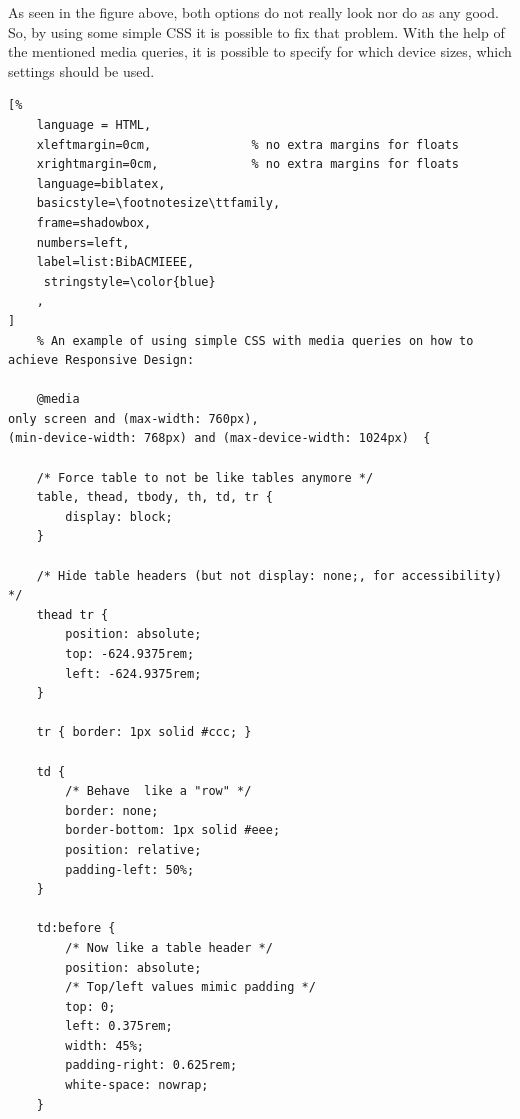 As seen in the figure above, both options do not really look nor do as any good.
So, by using some simple CSS it is possible to fix that problem. With the help of the mentioned
media queries, it is possible to specify for which device sizes, which settings should be used.

\begin{lstlisting}[%
    language = HTML,
    xleftmargin=0cm,              % no extra margins for floats
    xrightmargin=0cm,             % no extra margins for floats
    language=biblatex,
    basicstyle=\footnotesize\ttfamily,
    frame=shadowbox,
    numbers=left,
    label=list:BibACMIEEE,
     stringstyle=\color{blue}
    ,
]
    % An example of using simple CSS with media queries on how to achieve Responsive Design:

    @media
only screen and (max-width: 760px),
(min-device-width: 768px) and (max-device-width: 1024px)  {

	/* Force table to not be like tables anymore */
	table, thead, tbody, th, td, tr {
		display: block;
	}

	/* Hide table headers (but not display: none;, for accessibility) */
	thead tr {
		position: absolute;
		top: -624.9375rem;
		left: -624.9375rem;
	}

	tr { border: 1px solid #ccc; }

	td {
		/* Behave  like a "row" */
		border: none;
		border-bottom: 1px solid #eee;
		position: relative;
		padding-left: 50%;
	}

	td:before {
		/* Now like a table header */
		position: absolute;
		/* Top/left values mimic padding */
		top: 0;
		left: 0.375rem;
		width: 45%;
		padding-right: 0.625rem;
		white-space: nowrap;
	}

\end{lstlisting}

